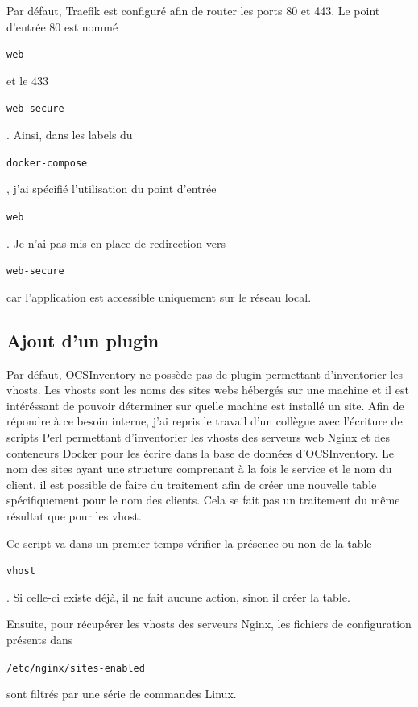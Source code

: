 \documentclass[12pt, a4paper, twoside]{article}
\begin{document}
Par défaut, \gls{Traefik} est configuré afin de router les ports 80 et 443.
Le point d'entrée 80 est nommé \begin{code}\texttt{web}\end{code} et le 433 \begin{code}\texttt{web-secure}\end{code}.
Ainsi, dans les labels du \begin{code}\texttt{docker-compose}\end{code}, j'ai spécifié l'utilisation du point d'entrée \begin{code}\texttt{web}\end{code}.
Je n'ai pas mis en place de redirection vers \begin{code}\texttt{web-secure}\end{code} car l'application est accessible uniquement sur le réseau local.

\newpage
\subsection{Ajout d'un plugin}
Par défaut, \gls{OCSInventory} ne possède pas de plugin permettant d'inventorier les vhosts. 
Les vhosts sont les noms des sites webs hébergés sur une machine et il est intéréssant de pouvoir déterminer sur quelle machine est installé un site. 
Afin de répondre à ce besoin interne, j'ai repris le travail d'un collègue avec l'écriture de scripts Perl permettant d'inventorier les vhosts des serveurs web Nginx et des conteneurs Docker pour les écrire dans la base de données d'\gls{OCSInventory}.
Le nom des sites ayant une structure comprenant à la fois le service et le nom du client, il est possible de faire du traitement afin de créer une nouvelle table spécifiquement pour le nom des clients.
Cela se fait pas un traitement du même résultat que pour les vhost.

Ce script va dans un premier temps vérifier la présence ou non de la table \begin{code}\texttt{vhost}\end{code}.
Si celle-ci existe déjà, il ne fait aucune action, sinon il créer la table.

Ensuite, pour récupérer les vhosts des serveurs Nginx, les fichiers de configuration présents dans \begin{code}\texttt{/etc/nginx/sites-enabled}\end{code} sont filtrés par une série de commandes \gls{Linux}.
\end{document}

